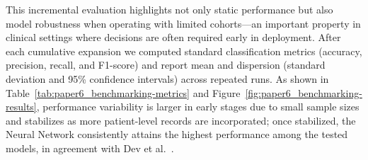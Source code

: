 This incremental evaluation highlights not only static performance but also model robustness when operating with limited cohorts—an important property in clinical settings where decisions are often required early in deployment. After each cumulative expansion we computed standard classification metrics (accuracy, precision, recall, and F1-score) and report mean and dispersion (standard deviation and 95\% confidence intervals) across repeated runs. As shown in Table~\ref{tab:paper6_benchmarking-metrics} and Figure~\ref{fig:paper6_benchmarking-results}, performance variability is larger in early stages due to small sample sizes and stabilizes as more patient-level records are incorporated; once stabilized, the Neural Network consistently attains the highest performance among the tested models, in agreement with Dev et al.~\cite{dev_predictive_2022}. 

